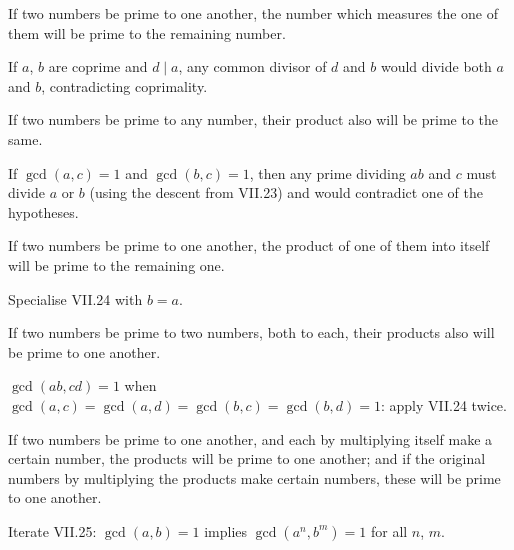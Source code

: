 \documentclass{rrxiv}
\begin{document}
\begin{claim}
\label{prop:VII.23}
If two numbers be prime to one another, the number which measures
the one of them will be prime to the remaining number.
\end{claim}
\begin{evidence}
\label{ev:VII.23}
If $a$, $b$ are coprime and $d \mid a$, any common divisor of $d$ and
$b$ would divide both $a$ and $b$, contradicting coprimality.
\end{evidence}

\begin{claim}
\label{prop:VII.24}
If two numbers be prime to any number, their product also will be
prime to the same.
\end{claim}
\begin{evidence}
\label{ev:VII.24}
If $\gcd(a, c) = 1$ and $\gcd(b, c) = 1$, then any prime dividing
$ab$ and $c$ must divide $a$ or $b$ (using the descent from
VII.23) and would contradict one of the hypotheses.
\end{evidence}

\begin{claim}
\label{prop:VII.25}
If two numbers be prime to one another, the product of one of them
into itself will be prime to the remaining one.
\end{claim}
\begin{evidence}
\label{ev:VII.25}
Specialise VII.24 with $b = a$.
\end{evidence}

\begin{claim}
\label{prop:VII.26}
If two numbers be prime to two numbers, both to each, their products
also will be prime to one another.
\end{claim}
\begin{evidence}
\label{ev:VII.26}
$\gcd(ab, cd) = 1$ when $\gcd(a, c) = \gcd(a, d) = \gcd(b, c) =
\gcd(b, d) = 1$: apply VII.24 twice.
\end{evidence}

\begin{claim}
\label{prop:VII.27}
If two numbers be prime to one another, and each by multiplying
itself make a certain number, the products will be prime to one
another; and if the original numbers by multiplying the products
make certain numbers, these will be prime to one another.
\end{claim}
\begin{evidence}
\label{ev:VII.27}
Iterate VII.25: $\gcd(a, b) = 1$ implies $\gcd(a^n, b^m) = 1$ for
all $n$, $m$.
\end{evidence}
\end{document}
